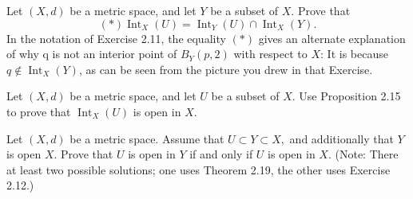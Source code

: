 \documentclass[12pt,letterpaper,boxed]{hmcpset}
\DeclareMathOperator{\Int}{Int}
\begin{document}
\begin{problem}[Exercise 2.12.]
Let $(X, d)$ be a metric space, and let $Y$ be a subset of $X$. Prove that $$(*) \Int_{X}(U) = \Int_{Y}(U)\cap\Int_{X}(Y).$$
In the notation of Exercise 2.11, the equality $(*)$ gives an alternate explanation of why q is not an interior point of $B_{Y}(p, 2)$ with respect to $X$: It is because $q \notin \Int_{X}(Y)$, as can be seen from the picture you drew in that Exercise.
\end{problem}
\begin{solution}

\end{solution}

\begin{problem}[Exercise 2.16.]
Let $(X, d)$ be a metric space, and let $U$ be a subset of $X$. Use Proposition 2.15 to prove that $\Int_{X}(U)$ is open in $X$.
\end{problem}
\begin{solution}

\end{solution}

\begin{problem}[Exercise 2.20.]
Let $(X, d)$ be a metric space. Assume that $U\subset Y\subset X,$ and additionally that $Y$ is open $X$. Prove that $U$ is open in $Y$ if and only if $U$ is open in $X$. (Note: There at least two possible solutions; one uses Theorem 2.19, the other uses Exercise 2.12.)
\end{problem}
\begin{solution}

\end{solution}
\end{document}
